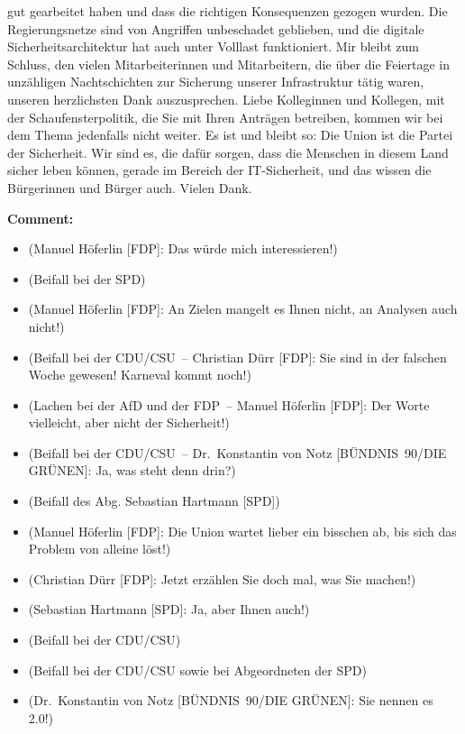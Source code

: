 \documentclass{article}
\begin{document}
gut gearbeitet haben und dass die richtigen Konsequenzen gezogen wurden. Die Regierungsnetze sind von Angriffen unbeschadet geblieben, und die digitale Sicherheitsarchitektur hat auch unter Volllast funktioniert. Mir bleibt zum Schluss, den vielen Mitarbeiterinnen und Mitarbeitern, die über die Feiertage in unzähligen Nachtschichten zur Sicherung unserer Infrastruktur tätig waren, unseren herzlichsten Dank auszusprechen.  Liebe Kolleginnen und Kollegen, mit der Schaufensterpolitik, die Sie mit Ihren Anträgen betreiben, kommen wir bei dem Thema jedenfalls nicht weiter. Es ist und bleibt so: Die Union ist die Partei der Sicherheit.  Wir sind es, die dafür sorgen, dass die Menschen in diesem Land sicher leben können, gerade im Bereich der IT-Sicherheit, und das wissen die Bürgerinnen und Bürger auch. Vielen Dank.  

\noindent\textbf{Comment:}
\begin{itemize}
    \setlength\itemsep{-3pt}
    \item (Manuel Höferlin [FDP]: Das würde mich interessieren!)
    \setlength\itemsep{-3pt}
    \item (Beifall bei der SPD)
    \setlength\itemsep{-3pt}
    \item (Manuel Höferlin [FDP]: An Zielen mangelt es Ihnen nicht, an Analysen auch nicht!)
    \setlength\itemsep{-3pt}
    \item (Beifall bei der CDU/CSU – Christian Dürr [FDP]: Sie sind in der falschen Woche gewesen! Karneval kommt noch!)
    \setlength\itemsep{-3pt}
    \item (Lachen bei der AfD und der FDP – Manuel Höferlin [FDP]: Der Worte vielleicht, aber nicht der Sicherheit!)
    \setlength\itemsep{-3pt}
    \item (Beifall bei der CDU/CSU – Dr. Konstantin von Notz [BÜNDNIS 90/DIE GRÜNEN]: Ja, was steht denn drin?)
    \setlength\itemsep{-3pt}
    \item (Beifall des Abg. Sebastian Hartmann [SPD])
    \setlength\itemsep{-3pt}
    \item (Manuel Höferlin [FDP]: Die Union wartet lieber ein bisschen ab, bis sich das Problem von alleine löst!)
    \setlength\itemsep{-3pt}
    \item (Christian Dürr [FDP]: Jetzt erzählen Sie doch mal, was Sie machen!)
    \setlength\itemsep{-3pt}
    \item (Sebastian Hartmann [SPD]: Ja, aber Ihnen auch!)
    \setlength\itemsep{-3pt}
    \item (Beifall bei der CDU/CSU)
    \setlength\itemsep{-3pt}
    \item (Beifall bei der CDU/CSU sowie bei Abgeordneten der SPD)
    \setlength\itemsep{-3pt}
    \item (Dr. Konstantin von Notz [BÜNDNIS 90/DIE GRÜNEN]: Sie nennen es 2.0!)
\end{itemize}
\end{document}
